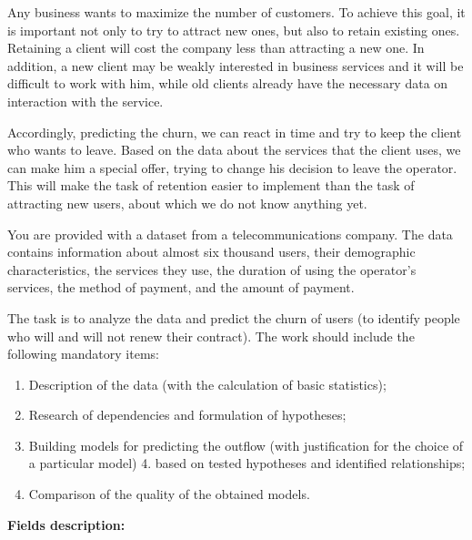 \documentclass[
  letterpaper,
  DIV=11,
  numbers=noendperiod]{scrreprt}
\providecommand{\tightlist}{%
  \setlength{\itemsep}{0pt}\setlength{\parskip}{0pt}}\usepackage{longtable,booktabs,array}
\begin{document}
Any business wants to maximize the number of customers. To achieve this
goal, it is important not only to try to attract new ones, but also to
retain existing ones. Retaining a client will cost the company less than
attracting a new one. In addition, a new client may be weakly interested
in business services and it will be difficult to work with him, while
old clients already have the necessary data on interaction with the
service.

Accordingly, predicting the churn, we can react in time and try to keep
the client who wants to leave. Based on the data about the services that
the client uses, we can make him a special offer, trying to change his
decision to leave the operator. This will make the task of retention
easier to implement than the task of attracting new users, about which
we do not know anything yet.

You are provided with a dataset from a telecommunications company. The
data contains information about almost six thousand users, their
demographic characteristics, the services they use, the duration of
using the operator's services, the method of payment, and the amount of
payment.

The task is to analyze the data and predict the churn of users (to
identify people who will and will not renew their contract). The work
should include the following mandatory items:

\begin{enumerate}
\def\labelenumi{\arabic{enumi}.}
\tightlist
\item
  Description of the data (with the calculation of basic statistics);
\item
  Research of dependencies and formulation of hypotheses;
\item
  Building models for predicting the outflow (with justification for the
  choice of a particular model) 4. based on tested hypotheses and
  identified relationships;
\item
  Comparison of the quality of the obtained models.
\end{enumerate}

\textbf{Fields description:}
\end{document}
